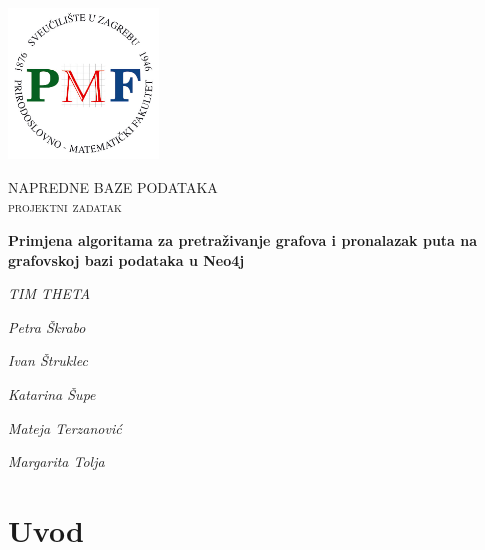 \documentclass[10pt]{scrartcl}
\begin{document}
\begin{titlepage}
	\centering
	\includegraphics[width=0.3\textwidth]{pmf}\par\vspace{1cm}
	{\scshape NAPREDNE BAZE PODATAKA \\ projektni zadatak \par}
	\vspace{1cm}
	{\huge\bfseries Primjena algoritama za pretraživanje grafova i pronalazak puta na grafovskoj bazi podataka u Neo4j \par}
	\vspace{5cm}
	{\Large\itshape TIM THETA\par
	\vspace{0.2cm}
	{\Large\itshape Petra Škrabo}\par
	\vspace{0.1cm}
	{\Large\itshape Ivan Štruklec}\par
	\vspace{0.1cm}
	{\Large\itshape Katarina Šupe}\par
	\vspace{0.1cm}
	{\Large\itshape Mateja Terzanović}\par
	\vspace{0.1cm}
	{\Large\itshape Margarita Tolja}\par
	\vfill}
\end{titlepage}

\tableofcontents
\newpage
\section{Uvod}
\end{document}
